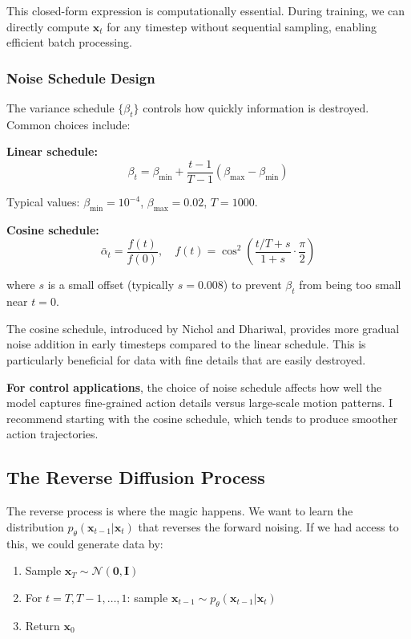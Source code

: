 This closed-form expression is computationally essential. During training, we can directly compute $\mathbf{x}_t$ for any timestep without sequential sampling, enabling efficient batch processing.

\subsubsection{Noise Schedule Design}

The variance schedule $\{\beta_t\}$ controls how quickly information is destroyed. Common choices include:

\textbf{Linear schedule:}
\begin{equation}
\beta_t = \beta_{\min} + \frac{t-1}{T-1}(\beta_{\max} - \beta_{\min})
\label{eq:linear_schedule}
\end{equation}

Typical values: $\beta_{\min} = 10^{-4}$, $\beta_{\max} = 0.02$, $T = 1000$.

\textbf{Cosine schedule:}
\begin{equation}
\bar{\alpha}_t = \frac{f(t)}{f(0)}, \quad f(t) = \cos^2\left(\frac{t/T + s}{1+s} \cdot \frac{\pi}{2}\right)
\label{eq:cosine_schedule}
\end{equation}

where $s$ is a small offset (typically $s = 0.008$) to prevent $\beta_t$ from being too small near $t=0$.

The cosine schedule, introduced by Nichol and Dhariwal, provides more gradual noise addition in early timesteps compared to the linear schedule. This is particularly beneficial for data with fine details that are easily destroyed.

\textbf{For control applications}, the choice of noise schedule affects how well the model captures fine-grained action details versus large-scale motion patterns. I recommend starting with the cosine schedule, which tends to produce smoother action trajectories.

\subsection{The Reverse Diffusion Process}
\label{subsec:reverse_process}

The reverse process is where the magic happens. We want to learn the distribution $p_\theta(\mathbf{x}_{t-1} | \mathbf{x}_t)$ that reverses the forward noising. If we had access to this, we could generate data by:

\begin{enumerate}
    \item Sample $\mathbf{x}_T \sim \mathcal{N}(\mathbf{0}, \mathbf{I})$
    \item For $t = T, T-1, \ldots, 1$: sample $\mathbf{x}_{t-1} \sim p_\theta(\mathbf{x}_{t-1} | \mathbf{x}_t)$
    \item Return $\mathbf{x}_0$
\end{enumerate}

